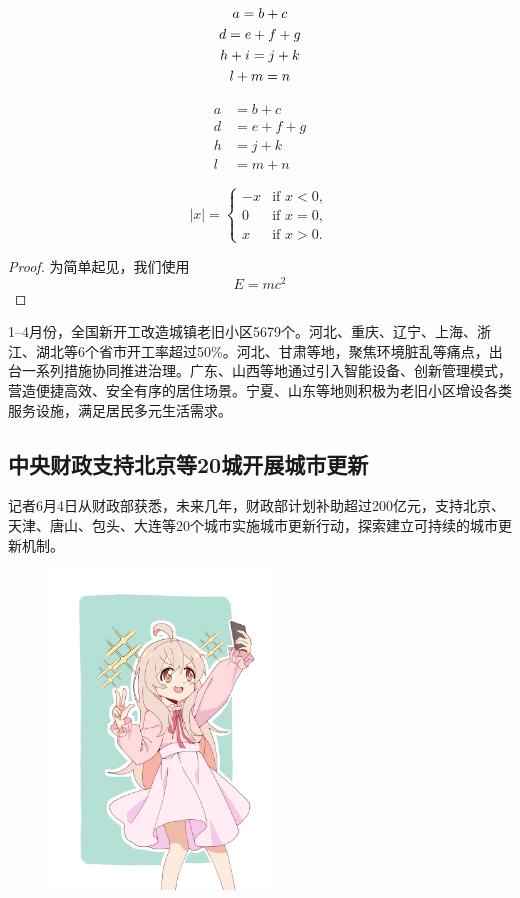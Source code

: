 \begin{gather}
	a = b + c \\
	d = e + f + g \\
	h + i = j + k \notag \\
	l + m = n
\end{gather}

\begin{equation}
	\begin{aligned}
		a &= b + c \\
		d &= e + f + g \\
		h&= j + k \\
		l&= m+n
	\end{aligned}
\end{equation}

\begin{equation}
|x| = \left\{
\begin{array}{rl}
	-x & \text{if } x < 0,\\
	0 & \text{if } x = 0,\\
	x & \text{if } x > 0.
\end{array} \right.
\end{equation}

\begin{proof}
	为简单起见，我们使用 
	$$E=mc^2$$
\end{proof}

1--4月份，全国新开工改造城镇老旧小区5679个。河北、重庆、辽宁、上海、浙江、湖北等6个省市开工率超过50\%。河北、甘肃等地，聚焦环境脏乱等痛点，出台一系列措施协同推进治理。广东、山西等地通过引入智能设备、创新管理模式，营造便捷高效、安全有序的居住场景。宁夏、山东等地则积极为老旧小区增设各类服务设施，满足居民多元生活需求。

\subsection{中央财政支持北京等20城开展城市更新}
记者6月4日从财政部获悉，未来几年，财政部计划补助超过200亿元，支持北京、天津、唐山、包头、大连等20个城市实施城市更新行动，探索建立可持续的城市更新机制。
\begin{figure}[!ht]
	\centering
	\includegraphics[width=6cm]{图片/sample.jpg}
	\label{fig:f1}	
\end{figure}

